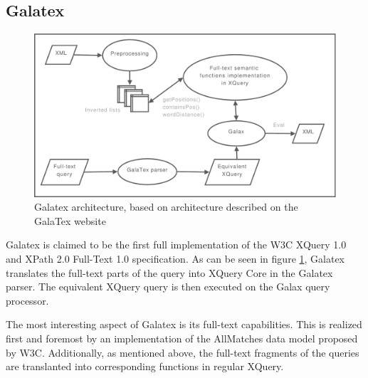 \subsection{Galatex}
\begin{figure}[h]
  \centering
    \includegraphics[width=1\textwidth]{diagrams/galatex_arch}
  \caption[GalaTex architecture]{Galatex architecture, based on architecture described on
  the GalaTex website\cite{galatex}}
  \label{figure:galatex:arch}
\end{figure}
Galatex is claimed to be the first full implementation of the W3C XQuery 1.0 
and XPath 2.0 Full-Text 1.0 specification\cite{w3c01}. As can be seen in figure
\ref{figure:galatex:arch}, Galatex translates the full-text parts of the query
into XQuery Core\cite{xquery_semantics} in the Galatex parser. The equivalent
XQuery query is then executed on the Galax query processor.

The most interesting aspect of Galatex is its full-text capabilities. This is
realized first and foremost by an implementation of the AllMatches data model
proposed by W3C\cite{w3c01}. Additionally, as mentioned above, the full-text fragments of the queries are
translanted into corresponding functions in regular XQuery. 

